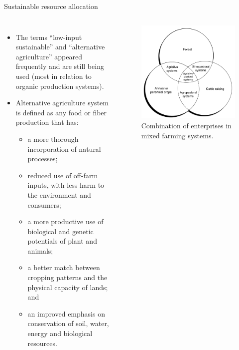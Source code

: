 \documentclass[
  ignorenonframetext,
  aspectratio=169]{beamer}
\providecommand{\tightlist}{%
  \setlength{\itemsep}{0pt}\setlength{\parskip}{0pt}}
\newcommand{\bcolumns}{\begin{columns}[T, onlytextwidth]}
\newcommand{\ecolumns}{\end{columns}}
\begin{document}
\begin{frame}{Sustainable resource allocation}
\protect\hypertarget{sustainable-resource-allocation}{}
\bcolumns
{}

\begin{itemize}
\tightlist
\item
  The terms ``low-input sustainable'' and ``alternative agriculture''
  appeared frequently and are still being used (most in relation to
  organic production systems).
\item
  Alternative agriculture system is defined as any food or fiber
  production that has:

  \begin{itemize}
  \footnotesize
  \item a more thorough incorporation of natural processes;
  \item reduced use of off-farm inputs, with less harm to the environment and consumers;
  \item a more productive use of biological and genetic potentials of plant and animals;
  \item a better match between cropping patterns and the physical capacity of lands; and
  \item an improved emphasis on conservation of soil, water, energy and biological resources.
  \end{itemize}
\end{itemize}


\begin{figure}
\includegraphics[width=0.45\linewidth]{../images/mixed_enterprises_sustainable_farming} \caption{Combination of enterprises in mixed farming systems.}\label{fig:mixed-enterprises-sustainable}
\end{figure}

\ecolumns
\end{frame}
\end{document}

